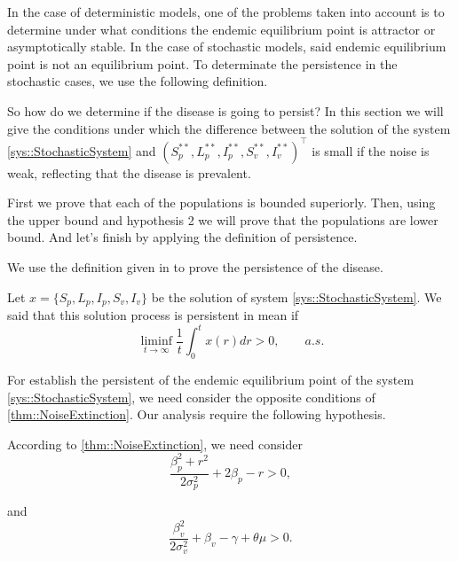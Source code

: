 
	In the case of deterministic models, one of the problems taken into
account is to determine under what conditions the endemic equilibrium point is 
attractor or asymptotically stable. In the case of stochastic models, said 
endemic equilibrium point is not an equilibrium point. To determinate the 
persistence in the stochastic cases, we use the following definition.

	So how do we determine if the disease is going to persist? In this section 
we will give the conditions under which the difference between the solution of 
the system \autoref{sys::StochasticSystem} and $ (S_p^{**}, L_p^{**}, I_p^{**}, S_v^{**}, I_v^{**})^\top$ is 
small if the noise is weak, reflecting that the disease is prevalent.

First we prove that each of the populations is bounded superiorly. Then, using the upper bound and
hypothesis 2 we will prove that the populations are lower bound. 
And let's finish by applying the definition of persistence.

We use the definition given in \cite{Zhao2015a} to prove the persistence of the disease.
\begin{definition}{\cite[][Def. *.*]{Zhao2015a}}
\label{def::persistence}
	Let $x = \{S_p,L_p,I_p,S_v,I_v\}$ be the solution of 
	system \autoref{sys::StochasticSystem}. 
	We said that this solution process is persistent in mean if	
	\begin{equation}
	    \liminf_{
	    	t \to
	    	\infty
	    }
	    \frac{1}{t}
	    \int_0^t x(r) dr >0,
	    \qquad a.s.
    \end{equation}
\end{definition}
For establish the persistent of the endemic equilibrium point of the system 
\autoref{sys::StochasticSystem}, we need consider the opposite conditions of 
\autoref{thm::NoiseExtinction}.
Our analysis require the following hypothesis.

\begin{hyp}\label{eqn::NoiseBreak}
	\item
	According to \autoref{thm::NoiseExtinction}, 
	we need consider  
	$$
		\frac{\beta_p^2+r^2}{2 \sigma_p^2} + 
		2\beta_p - r>0,
	$$ 
    \item
	and
	$$
		\frac{\beta_v^2}{2 \sigma_v^2}+\beta_v-\gamma +\theta\mu>0.
	$$
\end{hyp}

